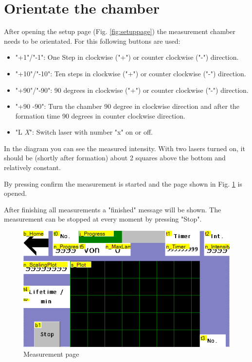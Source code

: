 	\section{Orientate the chamber}
	After opening the setup page (Fig. \ref{fig:setuppage}) the measurement chamber needs to be orientated. For this following buttons are used:
	\begin{itemize}
		\item "+1"/"-1": One Step in clockwise ("+") or counter clockwise ("-") direction.
		\item "+10"/"-10": Ten steps in clockwise ("+") or counter clockwise ("-") direction.
		\item "+90"/"-90": 90 degrees in clockwise ("+") or counter clockwise ("-") direction.
		\item "+90 -90": Turn the chamber 90 degree in clockwise direction and after the formation time 90 degrees in counter clockwise direction.
		\item "L \textit{X}": Switch laser with number "x" on or off. 
	\end{itemize}
	
	In the diagram you can see the measured intensity. With two lasers turned on, it should be (shortly after formation) about 2 squares above the bottom and relatively constant. 
	
	By pressing confirm the measurement is started and the page shown in Fig. \ref{fig:measurementpage} is opened. 
	
	After finishing all measurements a "finished" message will be shown. The measurement can be stopped at every moment by pressing "Stop".
	
	
	\begin{figure}[h]
		\centering
		\includegraphics[width=0.7\linewidth]{LamellaDevice_Hardware/MeasurementPage}
		\caption{Measurement page}
		\label{fig:measurementpage}
	\end{figure}

